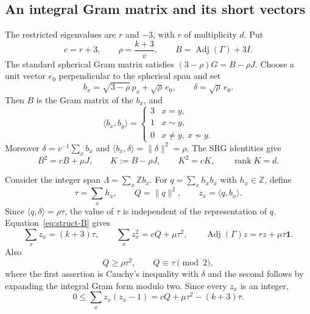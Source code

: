 \documentclass[11pt]{article}
\theoremstyle{remark}
\numberwithin{equation}{section}
\begin{document}
\subsection{An integral Gram matrix and its short vectors}
\label{subsec:struct-short}
The restricted eigenvalues are $r$ and $-3$, with $r$ of multiplicity $d$.
Put
\[
 c=r+3,\qquad \rho=\frac{k+3}{v},\qquad
 B=\operatorname{Adj}(\Gamma)+3I.
\]
The standard spherical Gram matrix satisfies
$(3-\rho)G=B-\rho J$.  Choose a unit vector $e_0$ perpendicular
to the spherical span and set
\[
 b_x=\sqrt{3-\rho}\,p_x+\sqrt\rho\,e_0,
 \qquad \delta=\sqrt\rho\,e_0.
\]
Then $B$ is the Gram matrix of the $b_x$, and
\begin{equation}\label{eq:struct-integral}
 \langle b_x,b_y\rangle=
 \begin{cases}3&x=y,\\1&x\sim y,\\0&x\ne y,\ x\not\sim y.
 \end{cases}
\end{equation}
Moreover $\delta=v^{-1}\sum_xb_x$ and
$\langle b_x,\delta\rangle=\|\delta\|^2=\rho$.
The SRG identities give
\begin{equation}\label{eq:struct-B}
 B^2=cB+\mu J,\qquad
 K:=B-\rho J,\qquad K^2=cK,\qquad
 \operatorname{rank}K=d.
\end{equation}

Consider the integer span $\Lambda=\sum_x\mathbb Zb_x$.
For $q=\sum_xh_xb_x$ with $h_x\in\mathbb Z$, define
\[
 \tau=\sum_xh_x,\qquad Q=\|q\|^2,\qquad z_x=\langle q,b_x\rangle.
\]
Since $\langle q,\delta\rangle=\rho\tau$, the value of $\tau$ is independent
of the representation of $q$. Equation~\eqref{eq:struct-B} gives
\begin{equation}\label{eq:struct-moments}
 \sum_xz_x=(k+3)\tau,\qquad
 \sum_xz_x^2=cQ+\mu\tau^2,\qquad
 \operatorname{Adj}(\Gamma)z=rz+\mu\tau\mathbf1.
\end{equation}
Also
\begin{equation}\label{eq:struct-parity}
 Q\ge\rho\tau^2,\qquad Q\equiv\tau\pmod2,
\end{equation}
where the first assertion is Cauchy's inequality with $\delta$ and
the second follows by expanding the integral Gram form modulo two.
Since every $z_x$ is an integer,
\begin{equation}\label{eq:struct-gap}
 0\le\sum_xz_x(z_x-1)=cQ+\mu\tau^2-(k+3)\tau.
\end{equation}
\end{document}
